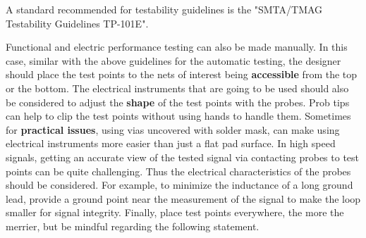 \documentclass[12pt]{article}
\begin{document}
A standard recommended for testability guidelines is the "SMTA/TMAG Testability Guidelines TP-101E".

Functional and electric performance testing can also be made manually. In this case, similar with the above guidelines for the automatic testing, the designer should place the test points to the nets of interest being \textbf{accessible} from the top or the bottom. The electrical instruments that are going to be used should also be considered to adjust the \textbf{shape} of the test points with the probes. Prob tips can help to clip the test points without using hands to handle them. Sometimes for \textbf{practical issues}, using vias uncovered with solder mask, can make using electrical instruments more easier than just a flat pad surface. In high speed signals, getting an accurate view of the tested signal via contacting probes to test points can be quite challenging. Thus the electrical characteristics of the probes should be considered. For example, to minimize the inductance of a long ground lead, provide a ground point near the measurement of the signal to make the loop smaller for signal integrity. Finally, place test points everywhere, the more the merrier, but be mindful regarding the following statement. 


\end{document}
